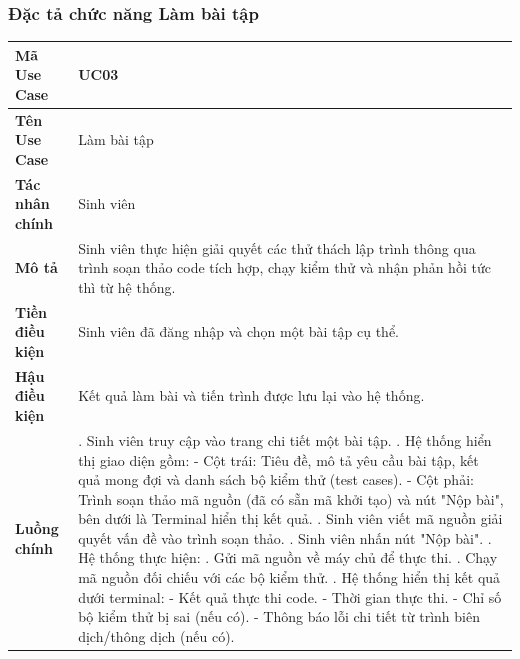 \documentclass[../main.tex]{subfiles}
\begin{document}
\subsubsection{Đặc tả chức năng Làm bài tập}


{
\renewcommand{\arraystretch}{1.5}
\begin{tabularx}{\textwidth}{|p{3.5cm}|>{\raggedright\arraybackslash}X|}
\caption{Bảng đặc tả chức năng Làm bài tập}
\label{tab:bang-dac-ta-chuc-nang-lam-bai-tap}
\\
\hline
\textbf{Mã Use Case} & UC03 \\
\hline
\textbf{Tên Use Case} & Làm bài tập \\
\hline
\textbf{Tác nhân chính} & Sinh viên \\
\hline
\textbf{Mô tả} & Sinh viên thực hiện giải quyết các thử thách lập trình thông qua trình soạn thảo code tích hợp, chạy kiểm thử và nhận phản hồi tức thì từ hệ thống. \\
\hline
\textbf{Tiền điều kiện} & Sinh viên đã đăng nhập và chọn một bài tập cụ thể. \\
\hline
\textbf{Hậu điều kiện} & Kết quả làm bài và tiến trình được lưu lại vào hệ thống. \\
\hline
\textbf{Luồng chính} & 1. Sinh viên truy cập vào trang chi tiết một bài tập. \newline 2. Hệ thống hiển thị giao diện gồm: \newline - Cột trái: Tiêu đề, mô tả yêu cầu bài tập, kết quả mong đợi và danh sách bộ kiểm thử (test cases). \newline - Cột phải: Trình soạn thảo mã nguồn (đã có sẵn mã khởi tạo) và nút "Nộp bài", bên dưới là Terminal hiển thị kết quả. \newline 3. Sinh viên viết mã nguồn giải quyết vấn đề vào trình soạn thảo. \newline 4. Sinh viên nhấn nút "Nộp bài". \newline 5. Hệ thống thực hiện: \newline 5.1. Gửi mã nguồn về máy chủ để thực thi. \newline 5.2. Chạy mã nguồn đối chiếu với các bộ kiểm thử. \newline 6. Hệ thống hiển thị kết quả dưới terminal: \newline - Kết quả thực thi code. \newline - Thời gian thực thi. \newline - Chỉ số bộ kiểm thử bị sai (nếu có). \newline - Thông báo lỗi chi tiết từ trình biên dịch/thông dịch (nếu có). \\

\end{tabularx}}
\end{document}

